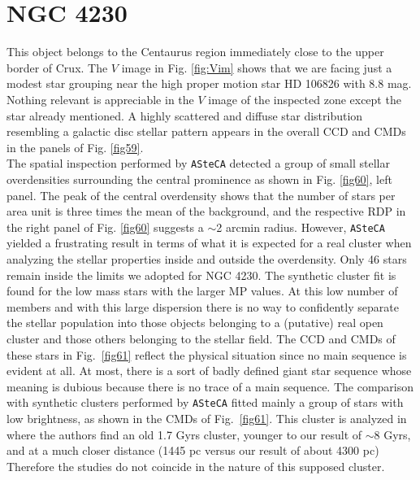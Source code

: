 \documentclass[referee]{aa}
\begin{document}
\section{NGC 4230}

This object belongs to the Centaurus region immediately close to the upper
border of Crux. The $V$ image in Fig. \ref{fig:Vim} shows that we are facing
just a modest star grouping near the high proper motion star HD 106826 with 8.8
mag.
Nothing relevant is appreciable in the $V$ image of the inspected zone except
the star already mentioned. A highly scattered and diffuse star distribution
resembling a galactic disc stellar pattern appears in the overall CCD
and CMDs in the panels of Fig. \ref{fig59}.\\

The spatial inspection performed by \texttt{ASteCA} detected a group of small
stellar overdensities surrounding the central prominence as shown in Fig.
\ref{fig60}, left panel. The peak of the central overdensity shows that the
number of stars per area unit is three times the mean of the background, and the
respective RDP in the right panel of Fig. \ref{fig60} suggests a $\sim$2 arcmin
radius.
However, \texttt{ASteCA} yielded a frustrating result in terms of what
it is expected for a real cluster when analyzing the stellar properties inside
and outside the overdensity.
Only 46 stars remain inside the limits we adopted for NGC 4230. The synthetic
cluster fit is found for the low mass stars with the larger MP values. At this
low number of members and with this large dispersion there is no way to
confidently separate the stellar population into those objects belonging to a 
(putative) real open cluster and those others belonging to the stellar field.
%
The CCD and CMDs of these stars in Fig.~\ref{fig61} reflect the physical
situation since no main sequence is evident at all. At most, there is a sort of
badly defined giant star sequence whose meaning is dubious because there is no
trace of a main sequence.
The comparison with synthetic clusters performed by \texttt{ASteCA}
fitted mainly a group of stars with low brightness, as shown in the CMDs of
Fig.~\ref{fig61}. This cluster is analyzed in \cite{Tadross_2011} where the
authors find an old 1.7 Gyrs cluster, younger to our result of $\sim$8 Gyrs,
and at a much closer distance (1445 pc versus our result of about 4300 pc)
Therefore the studies do not coincide in the nature of this supposed cluster.\\
\end{document}
